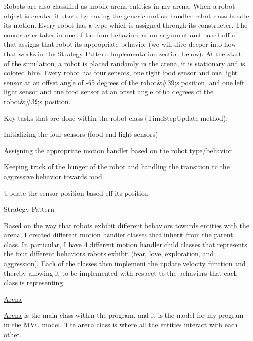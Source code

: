 Robots are also classified as mobile arena entities in my arena. When a robot object is created it starts by having the generic motion handler robot class handle its motion. Every robot has a type which is assigned through its constructer. The constructer takes in one of the four behaviors as an argument and based off of that assigns that robot its appropriate behavior (we will dive deeper into how that works in the Strategy Pattern Implementation section below). At the start of the simulation, a robot is placed randomly in the arena, it is stationary and is colored blue. Every robot has four sensors, one right food sensor and one light sensor at an offset angle of -\/65 degrees of the robot\&\#39;s position, and one left light sensor and one food sensor at an offset angle of 65 degrees of the robot\&\#39;s position.

Key tasks that are done within the robot class (Time\+Step\+Update method)\+:


\begin{DoxyItemize}
\item Initializing the four sensors (food and light sensors)
\item Assigning the appropriate motion handler based on the robot type/behavior
\item Keeping track of the hunger of the robot and handling the transition to the aggressive behavior towards food.
\item Update the sensor position based off its position.
\item Strategy Pattern
\begin{DoxyItemize}
\item Based on the way that robots exhibit different behaviors towards entities with the arena, I created different motion handler classes that inherit from the parent class. In particular, I have 4 different motion handler child classes that represents the four different behaviors robots exhibit (fear, love, exploration, and aggression). Each of the classes then implement the update velocity function and thereby allowing it to be implemented with respect to the behaviors that each class is representing.
\end{DoxyItemize}
\end{DoxyItemize}

\hyperlink{class_arena}{Arena}

\hyperlink{class_arena}{Arena} is the main class within the program, and it is the model for my program in the M\+VC model. The arena class is where all the entities interact with each other.

